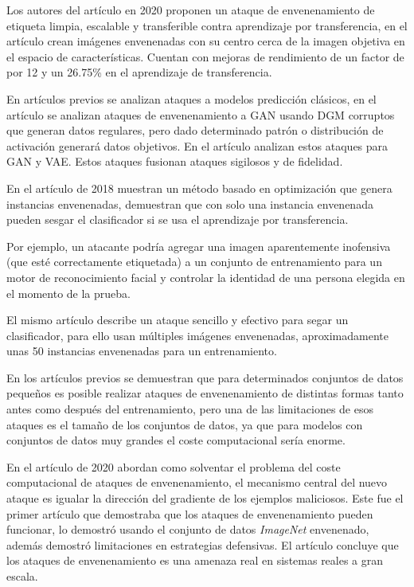Los autores del artículo \cite{aghakhani2021bullseye} en 2020 proponen un ataque de envenenamiento de etiqueta limpia, escalable y transferible contra aprendizaje por transferencia, en el artículo crean imágenes envenenadas con su centro cerca de la imagen objetiva en el espacio de características. Cuentan con mejoras de rendimiento de un factor de por 12 y un 26.75\% en el aprendizaje de transferencia.

En artículos previos se analizan ataques a modelos predicción clásicos, en el artículo \cite{rawat2022devil} se analizan ataques de envenenamiento a \gls{GAN} usando \gls{DGM} corruptos que generan datos regulares, pero dado determinado patrón o distribución de activación generará datos objetivos. En el artículo analizan estos ataques para \gls{GAN} y \gls{VAE}. Estos ataques fusionan ataques sigilosos y de fidelidad.

En el artículo \cite{shafahi2018poison} de 2018 muestran un método basado en optimización que genera instancias envenenadas, demuestran que con solo una instancia envenenada pueden sesgar el clasificador si se usa el aprendizaje por transferencia.

\begin{displayquote}
    Por ejemplo, un atacante podría agregar una imagen aparentemente inofensiva (que esté correctamente etiquetada) a un conjunto de entrenamiento para un motor de reconocimiento facial y controlar la identidad de una persona elegida en el momento de la prueba.
    \hr
\end{displayquote}

El mismo artículo describe un ataque sencillo y efectivo para segar un clasificador, para ello usan múltiples imágenes envenenadas, aproximadamente unas 50 instancias envenenadas para un entrenamiento.

En los artículos previos se demuestran que para determinados conjuntos de datos pequeños es posible realizar ataques de envenenamiento de distintas formas tanto antes como después del entrenamiento, pero una de las limitaciones de esos ataques es el tamaño de los conjuntos de datos, ya que para modelos con conjuntos de datos muy grandes el coste computacional sería enorme.

En el artículo \cite{geiping2021witches} de 2020 abordan como solventar el problema del coste computacional de ataques de envenenamiento, el mecanismo central del nuevo ataque es igualar la dirección del gradiente de los ejemplos maliciosos. Este fue el primer artículo que demostraba que los ataques de envenenamiento pueden funcionar, lo demostró usando el conjunto de datos \textit{ImageNet} envenenado, además demostró limitaciones en estrategias defensivas. El artículo concluye que los ataques de envenenamiento es una amenaza real en sistemas reales a gran escala.


